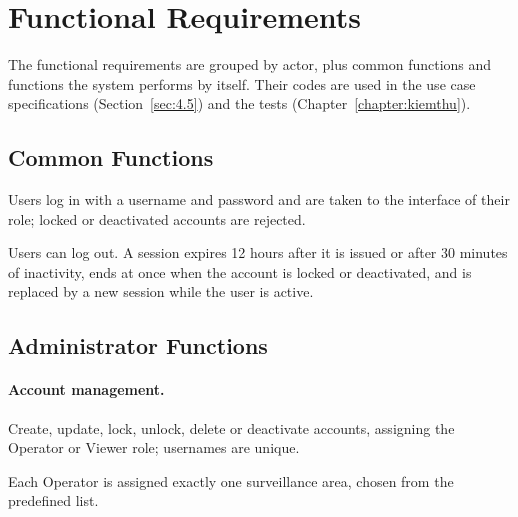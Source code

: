 \section{Functional Requirements}
\label{sec:4.2}

The functional requirements are grouped by actor, plus common functions and functions the system performs by itself. Their codes are used in the use case specifications (Section~\ref{sec:4.5}) and the tests (Chapter~\ref{chapter:kiemthu}).

\subsection{Common Functions}
\label{sec:4.2.1}

\begin{reqlist}
    \item[FR-C01] Users log in with a username and password and are taken to the interface of their role; locked or deactivated accounts are rejected.
    \item[FR-C02] Users can log out. A session expires 12 hours after it is issued or after 30 minutes of inactivity, ends at once when the account is locked or deactivated, and is replaced by a new session while the user is active.
\end{reqlist}

\subsection{Administrator Functions}
\label{sec:4.2.2}

\paragraph{Account management.}
\begin{reqlist}
    \item[FR-A01] Create, update, lock, unlock, delete or deactivate accounts, assigning the Operator or Viewer role; usernames are unique.
    \item[FR-A02] Each Operator is assigned exactly one surveillance area, chosen from the predefined list.
\end{reqlist}

